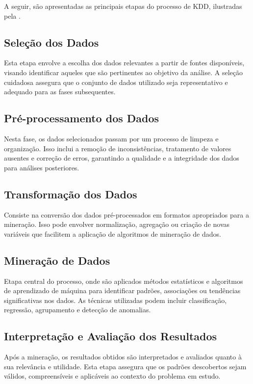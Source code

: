 A seguir, são apresentadas as principais etapas do processo de \acrshort{KDD}, ilustradas pela .

%

\subsection{Seleção dos Dados}
Esta etapa envolve a escolha dos dados relevantes a partir de fontes disponíveis, visando identificar aqueles que são pertinentes ao objetivo da análise. A seleção cuidadosa assegura que o conjunto de dados utilizado seja representativo e adequado para as fases subsequentes. 

\subsection{Pré-processamento dos Dados}
Nesta fase, os dados selecionados passam por um processo de limpeza e organização. Isso inclui a remoção de inconsistências, tratamento de valores ausentes e correção de erros, garantindo a qualidade e a integridade dos dados para análises posteriores. 

\subsection{Transformação dos Dados}
Consiste na conversão dos dados pré-processados em formatos apropriados para a mineração. Isso pode envolver normalização, agregação ou criação de novas variáveis que facilitem a aplicação de algoritmos de mineração de dados. 

\subsection{Mineração de Dados}
Etapa central do processo, onde são aplicados métodos estatísticos e algoritmos de aprendizado de máquina para identificar padrões, associações ou tendências significativas nos dados. As técnicas utilizadas podem incluir classificação, regressão, agrupamento e detecção de anomalias. 

\subsection{Interpretação e Avaliação dos Resultados}
Após a mineração, os resultados obtidos são interpretados e avaliados quanto à sua relevância e utilidade. Esta etapa assegura que os padrões descobertos sejam válidos, compreensíveis e aplicáveis ao contexto do problema em estudo.


